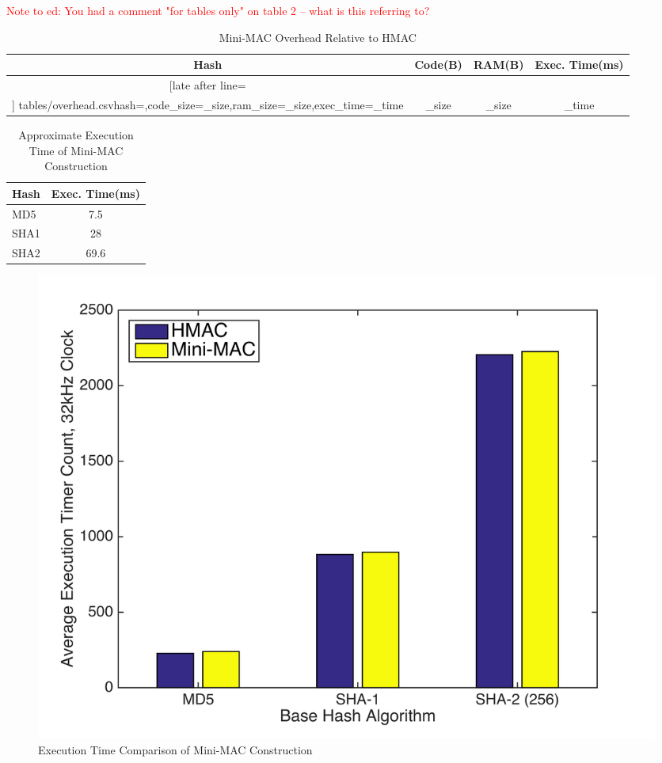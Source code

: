 \textcolor{red}{Note to ed: You had a comment "for tables only" on table 2 -- what is this referring to?} 
	\begin{table}	
	\centering
	\begin{tabular}{|c|c|c|c|}\hline%
	\bfseries Hash & \bfseries Code(B) & \bfseries RAM(B) & \bfseries Exec. Time(ms)\\\hline \csvreader[late after line=\\]%
		{tables/overhead.csv}{hash=\hash,code_size=\code_size,ram_size=\ram_size,exec_time=\exec_time}%
		{\hash & \code_size & \ram_size & \exec_time}%
		\hline
	\end{tabular}
	\vspace{11pt}
	\caption{Mini-MAC Overhead Relative to HMAC}
	\end{table}
	
	\begin{table}
	\centering
	\begin{tabular}{| @{}l | S[table-format=2.1] | @{}}
		\hline 
		\hspace{2pt}\textbf{Hash} & {\textbf{Exec. Time(ms)}} \\
		\hline 
		\hspace{2pt}MD5 & 7.5 \\
		\hspace{2pt}SHA1 & 28 \\
		\hspace{2pt}SHA2 & 69.6 \\ 
		\hline
	\end{tabular}
	\vspace{8pt}
	\caption{Approximate Execution Time of Mini-MAC Construction}	
	\end{table}
	
	\begin{figure}
		\centering
		\includegraphics[width=\columnwidth]{figures/exec_cycles.png}
		\caption{Execution Time Comparison of Mini-MAC Construction}
	\end{figure}
	
